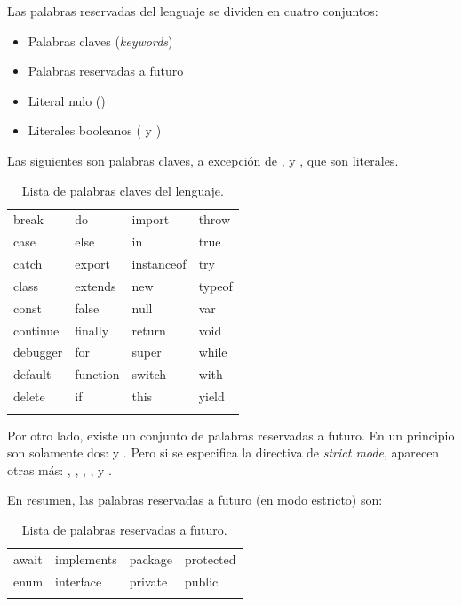 Las palabras reservadas del lenguaje se dividen en cuatro conjuntos:

\begin{itemize}
\item Palabras claves (\textit{keywords})
\item Palabras reservadas a futuro
\item Literal nulo ()
\item Literales booleanos ( y )
\end{itemize}

Las siguientes son palabras claves, a excepción de ,  y , que son literales.

\begin{table}[!h]
\caption{Lista de palabras claves del lenguaje.}
\label{tab:reservedkeywords}
\centering
\begin{tabular}{l l l l}
\toprule
break & do & import & throw\\
case & else & in & true\\
catch & export & instanceof & try\\
class & extends & new & typeof\\
const & false & null & var\\
continue & finally & return & void\\
debugger & for & super & while\\
default & function & switch & with\\
delete & if & this & yield\\
\bottomrule\\
\end{tabular}
\end{table}

Por otro lado, existe un conjunto de palabras reservadas a futuro. En un principio son solamente dos:  y . Pero si se especifica la directiva de \textit{strict mode}, aparecen otras más: , , , ,  y .

En resumen, las palabras reservadas a futuro (en modo estricto) son:

\begin{table}[!h]
\caption{Lista de palabras reservadas a futuro.}
\label{tab:futurereservedkeywords}
\centering
\begin{tabular}{l l l l}
\toprule
await & implements & package & protected\\
enum & interface & private & public\\
\bottomrule\\
\end{tabular}
\end{table}


